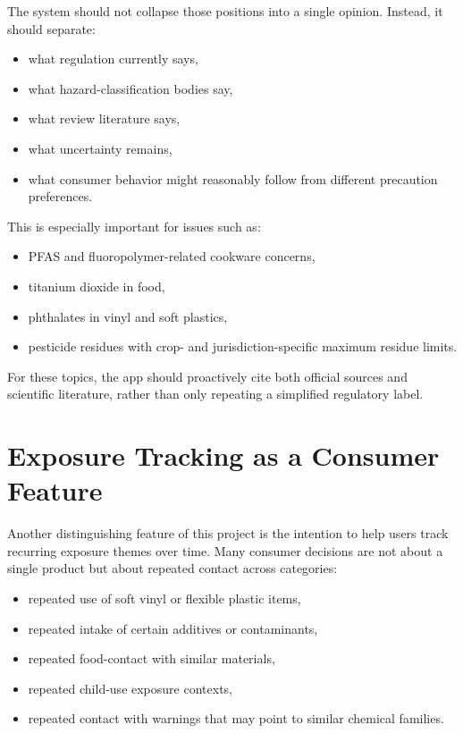 \documentclass[11pt]{article}
\begin{document}
The system should not collapse those positions into a single opinion. Instead, it should separate:

\begin{itemize}[leftmargin=1.5em]
\item what regulation currently says,
\item what hazard-classification bodies say,
\item what review literature says,
\item what uncertainty remains,
\item what consumer behavior might reasonably follow from different precaution preferences.
\end{itemize}

This is especially important for issues such as:

\begin{itemize}[leftmargin=1.5em]
\item PFAS and fluoropolymer-related cookware concerns,
\item titanium dioxide in food,
\item phthalates in vinyl and soft plastics,
\item pesticide residues with crop- and jurisdiction-specific maximum residue limits.
\end{itemize}

For these topics, the app should proactively cite both official sources and scientific literature, rather than only repeating a simplified regulatory label.

\section{Exposure Tracking as a Consumer Feature}

Another distinguishing feature of this project is the intention to help users track recurring exposure themes over time. Many consumer decisions are not about a single product but about repeated contact across categories:

\begin{itemize}[leftmargin=1.5em]
\item repeated use of soft vinyl or flexible plastic items,
\item repeated intake of certain additives or contaminants,
\item repeated food-contact with similar materials,
\item repeated child-use exposure contexts,
\item repeated contact with warnings that may point to similar chemical families.
\end{itemize}
\end{document}
